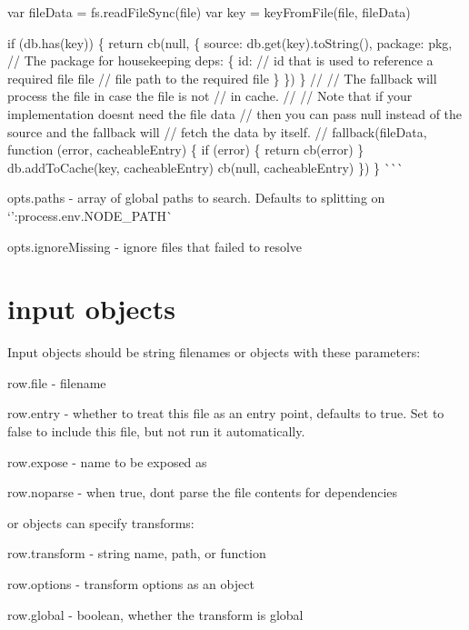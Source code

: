 \begin{DoxyItemize}
var file\+Data = fs.\+read\+File\+Sync(file) var key = key\+From\+File(file, file\+Data)

if (db.\+has(key)) \{ return cb(null, \{ source\+: db.\+get(key).to\+String(), package\+: pkg, // The package for housekeeping deps\+: \{ \textquotesingle{}id\textquotesingle{}\+: // id that is used to reference a required file \textquotesingle{}file\textquotesingle{} // file path to the required file \} \}) \} // // The fallback will process the file in case the file is not // in cache. // // Note that if your implementation doesn\textquotesingle{}t need the file data // then you can pass {\ttfamily null} instead of the source and the fallback will // fetch the data by itself. // fallback(file\+Data, function (error, cacheable\+Entry) \{ if (error) \{ return cb(error) \} db.\+add\+To\+Cache(key, cacheable\+Entry) cb(null, cacheable\+Entry) \}) \} \`{}\`{}\`{}
\item {\ttfamily opts.\+paths} -\/ array of global paths to search. Defaults to splitting on `'\+:process.\+env.\+N\+O\+D\+E\+\_\+\+P\+A\+TH\`{}
\item {\ttfamily opts.\+ignore\+Missing} -\/ ignore files that failed to resolve
\end{DoxyItemize}

\section*{input objects}

Input objects should be string filenames or objects with these parameters\+:


\begin{DoxyItemize}
\item {\ttfamily row.\+file} -\/ filename
\item {\ttfamily row.\+entry} -\/ whether to treat this file as an entry point, defaults to {\ttfamily true}. Set to {\ttfamily false} to include this file, but not run it automatically.
\item {\ttfamily row.\+expose} -\/ name to be exposed as
\item {\ttfamily row.\+noparse} -\/ when true, don\textquotesingle{}t parse the file contents for dependencies
\end{DoxyItemize}

or objects can specify transforms\+:


\begin{DoxyItemize}
\item {\ttfamily row.\+transform} -\/ string name, path, or function
\item {\ttfamily row.\+options} -\/ transform options as an object
\item {\ttfamily row.\+global} -\/ boolean, whether the transform is global
\end{DoxyItemize}

